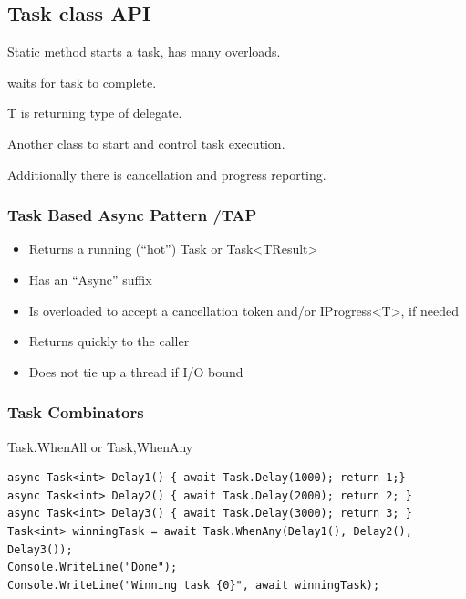 \documentclass[a4paper,10pt]{scrartcl}
\begin{document}
\subsection{Task class API}
\begin{description}
 \item [Task.Run(somedelegate)] Static method starts a task, has many overloads.
 \item [Task.Wait] waits for task to complete. 
 \item[ Task<T> = Task.Run( someDelegate)] T is returning type of delegate.
 \item[TaskCompletionSource]  Another class to start and control task execution.
 \item Additionally there is cancellation and progress reporting. 
 

\end{description}

\subsubsection{Task Based Async Pattern /TAP}
\begin{itemize}


\item Returns a running (“hot”) Task or Task<TResult>
\item Has an “Async” suffix
\item Is overloaded to accept a cancellation token and/or
IProgress<T>, if needed
\item Returns quickly to the caller
\item Does not tie up a thread if I/O bound
\end{itemize}

\subsubsection{Task Combinators}
Task.WhenAll or Task,WhenAny
\begin{lstlisting}[caption=Combinator Task example]
 async Task<int> Delay1() { await Task.Delay(1000); return 1;}
async Task<int> Delay2() { await Task.Delay(2000); return 2; }
async Task<int> Delay3() { await Task.Delay(3000); return 3; }
Task<int> winningTask = await Task.WhenAny(Delay1(), Delay2(),
Delay3());
Console.WriteLine("Done");
Console.WriteLine("Winning task {0}", await winningTask);

\end{lstlisting}
\end{document}
